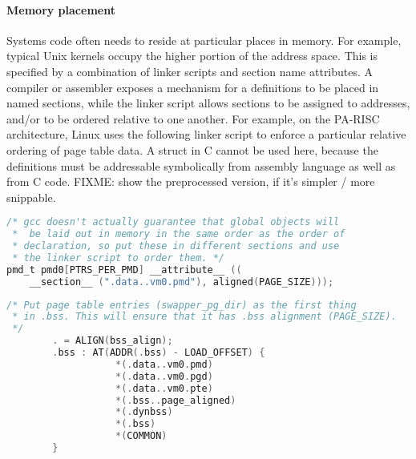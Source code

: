

\paragraph{Memory placement}
Systems code often needs to reside at particular places in memory.
For example, typical Unix kernels occupy the higher portion of the address space.
This is specified by a combination of linker scripts and section name attributes. 
A compiler or assembler exposes a mechanism for a definitions to be placed in named sections,
while the linker script allows sections to be assigned to addresses, 
and/or to be ordered relative to one another.
For example, on the PA-RISC architecture, Linux uses the following 
linker script to enforce a particular relative ordering of page table data.
A struct in C cannot be used here, because the definitions must be addressable
symbolically from assembly language as well as from C code.
FIXME: show the preprocessed version, if it's simpler / more snippable.

{\scriptsize\begin{lstlisting}[language=C,columns=flexible,basicstyle=\sffamily]
/* gcc doesn't actually guarantee that global objects will
 *  be laid out in memory in the same order as the order of 
 * declaration, so put these in different sections and use
 * the linker script to order them. */
pmd_t pmd0[PTRS_PER_PMD] __attribute__ ((
    __section__ (".data..vm0.pmd"), aligned(PAGE_SIZE)));
\end{lstlisting}}

{\scriptsize\begin{lstlisting}[language=C,columns=flexible,basicstyle=\sffamily]
/* Put page table entries (swapper_pg_dir) as the first thing 
 * in .bss. This will ensure that it has .bss alignment (PAGE_SIZE).
 */
        . = ALIGN(bss_align);                
        .bss : AT(ADDR(.bss) - LOAD_OFFSET) {
                   *(.data..vm0.pmd)
                   *(.data..vm0.pgd)
                   *(.data..vm0.pte)
                   *(.bss..page_aligned)     
                   *(.dynbss)                
                   *(.bss)                   
                   *(COMMON)                 
        }
\end{lstlisting}}

